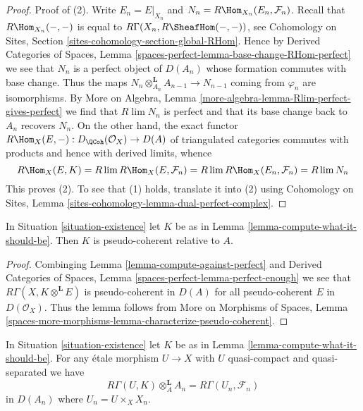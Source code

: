 \begin{proof}
Proof of (2). Write $E_n = E|_{X_n}$ and
$N_n = R\Hom_{X_n}(E_n, \mathcal{F}_n)$.
Recall that $R\Hom_{X_n}(-, -)$ is equal to
$R\Gamma(X_n, R\SheafHom(-, -))$, see
Cohomology on Sites, Section \ref{sites-cohomology-section-global-RHom}.
Hence by Derived Categories of Spaces, Lemma
\ref{spaces-perfect-lemma-base-change-RHom-perfect}
we see that $N_n$ is a perfect object of $D(A_n)$
whose formation commutes with base change. Thus the maps
$N_n \otimes_{A_n}^\mathbf{L} A_{n - 1} \to N_{n - 1}$
coming from $\varphi_n$ are isomorphisms.
By More on Algebra, Lemma \ref{more-algebra-lemma-Rlim-perfect-gives-perfect}
we find that $R\lim N_n$ is perfect and
that its base change back to $A_n$ recovers $N_n$.
On the other hand, the exact functor
$R\Hom_X(E, -) : D_\QCoh(\mathcal{O}_X) \to D(A)$
of triangulated categories commutes with products
and hence with derived limits, whence
$$
R\Hom_X(E, K) =
R\lim R\Hom_X(E, \mathcal{F}_n) =
R\lim R\Hom_X(E_n, \mathcal{F}_n) =
R\lim N_n
$$
This proves (2). To see that (1) holds, translate it into (2)
using Cohomology on Sites, Lemma
\ref{sites-cohomology-lemma-dual-perfect-complex}.
\end{proof}

\begin{lemma}
\label{lemma-relative-pseudo-coherence}
In Situation \ref{situation-existence} let $K$ be as in
Lemma \ref{lemma-compute-what-it-should-be}. Then $K$
is pseudo-coherent relative to $A$.
\end{lemma}

\begin{proof}
Combinging Lemma \ref{lemma-compute-against-perfect} and
Derived Categories of Spaces, Lemma \ref{spaces-perfect-lemma-perfect-enough}
we see that $R\Gamma(X, K \otimes^\mathbf{L} E)$
is pseudo-coherent in $D(A)$ for all pseudo-coherent
$E$ in $D(\mathcal{O}_X)$. Thus the lemma follows from
More on Morphisms of Spaces, Lemma
\ref{spaces-more-morphisms-lemma-characterize-pseudo-coherent}.
\end{proof}

\begin{lemma}
\label{lemma-compute-over-affine}
In Situation \ref{situation-existence} let $K$ be as in
Lemma \ref{lemma-compute-what-it-should-be}. For any
\'etale morphism $U \to X$ with $U$ quasi-compact and quasi-separated we have
$$
R\Gamma(U, K) \otimes_A^\mathbf{L} A_n =
R\Gamma(U_n, \mathcal{F}_n)
$$
in $D(A_n)$ where $U_n = U \times_X X_n$.
\end{lemma}

